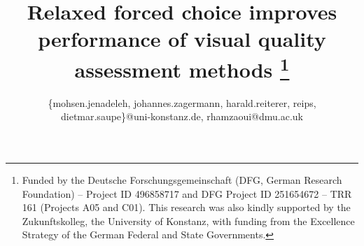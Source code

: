 \documentclass[a4paper,conference]{IEEEtran}
\begin{document}
\title{Relaxed forced choice improves performance of visual quality assessment methods%
\thanks{Funded by the Deutsche Forschungsgemeinschaft (DFG, German Research Foundation) -- Project ID 496858717 and DFG Project ID 251654672 -- TRR 161 (Projects A05 and C01). This research was also kindly supported by the Zukunftskolleg, the University of Konstanz, with funding from the Excellence Strategy of the German Federal and State Governments.}
}
\author{
\{mohsen.jenadeleh, johannes.zagermann, harald.reiterer, reips, dietmar.saupe\}@uni-konstanz.de, rhamzaoui@dmu.ac.uk }
%
\end{document}
